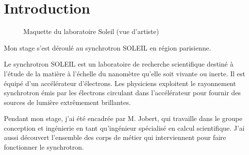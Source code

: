



			
\chapter*{Introduction}

\begin{figure}
  \centering
  \caption{Maquette du laboratoire Soleil (vue d'artiste)}
\end{figure}

     Mon stage s'est déroulé au synchrotron SOLEIL en région parisienne. 



		
     Le synchrotron SOLEIL est un laboratoire de recherche scientifique destiné à l'étude de la matière à l'échelle du nanomètre qu'elle soit vivante ou inerte. Il est équipé d'un accélérateur d'électrons. Les physiciens exploitent le rayonnement synchrotron émis par les électrons circulant dans l'accélérateur pour fournir des sources de lumière extrêmement brillantes.

     Pendant mon stage, j'ai été encadrée par M. Jobert, qui travaille dans le groupe conception et ingénierie en tant qu'ingénieur spécialisé en calcul scientifique. J'ai aussi découvert l'ensemble des corps de métier qui interviennent pour faire fonctionner le synchrotron.
		
